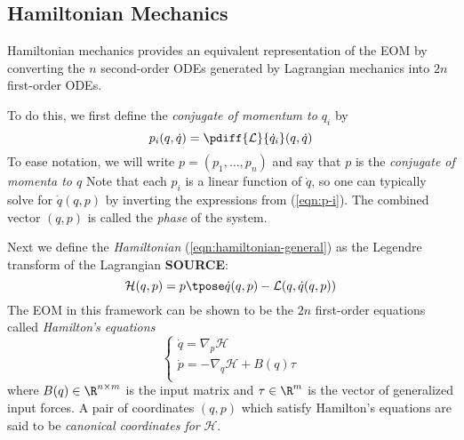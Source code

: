 \subsection{Hamiltonian Mechanics}
Hamiltonian mechanics provides an equivalent representation of the EOM
by converting the \(n\) second-order ODEs generated by Lagrangian mechanics into
\(2n\) first-order ODEs.

To do this, we first define the \textit{conjugate of momentum to \(q_i\)} by
\begin{equation}\label{eqn:p-i}
    p_i(q,\dot{q}) = \pdiff{\mathcal{L}}{\dot{q}_i}(q,\dot{q})
\end{equation}
To ease notation, we will write \(p = (p_1, \ldots, p_n)\) and say that \(p\) is
the \textit{conjugate of momenta to \(q\)} Note that each \(p_i\) is a linear
function of \(\dot{q}\), so one can typically solve for \(\dot{q}(q,p)\) by
inverting the expressions from (\ref{eqn:p-i}). The combined vector \((q,p)\) is
called the \textit{phase} of the system.

Next we define the \textit{Hamiltonian} (\ref{eqn:hamiltonian-general}) 
as the Legendre transform of the Lagrangian \textbf{SOURCE}:
\begin{equation}\label{eqn:hamiltonian-general}
    \mathcal{H}(q,p) = p\tpose \dot{q}(q,p) - \mathcal{L}(q,\dot{q}(q,p))
\end{equation}
The EOM in this framework can be shown to be the \(2n\)
first-order equations called \textit{Hamilton's equations}
\begin{equation}\label{eqn:hamiltons-eqns}
    \begin{cases}
        \dot{q} = \nabla_p\mathcal{H} \\
        \dot{p} = -\nabla_q\mathcal{H} + B(q)\tau \\
    \end{cases}
\end{equation}
where \(B(q) \in \R^{n\times m}\) is the input matrix and 
\(\tau \in \R^m\) is the vector of generalized input forces. A pair of
coordinates \((q,p)\) which satisfy Hamilton's equations are said to be 
\textit{canonical coordinates for} \(\mathcal{H}\).

